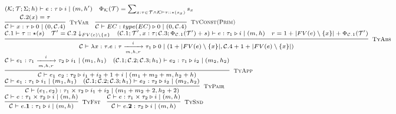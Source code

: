 \documentclass[fleqn]{article}
\begin{document}
\newcommand{\jtygc}[6]{#1 \vdash #2 : #3 \triangleright #4 \mid (#5, #6)}

\[
\scriptsize
\begin{array}{l}
	(\mathcal{K}; \mathcal{T}; \Sigma; h) \vdash e : \tau \triangleright i \mid (m, h') \hspace{1em}
	\Phi_{\mathcal{K}}(\mathcal{T}) = \sum_{x:\tau \in \mathcal{T} \land \mathcal{K} \vdash \tau :: \star(s_x)} s_x \\
	
	\infer[\textsc{TyVar}]{\jtygc{\mathcal{C}}{x}{\tau}{0}{0}{\mathcal{C}.4}}{\mathcal{C}.2(x)=\tau} \hspace{1em}
	
	\infer[\textsc{TyConst(Prim)}]{\jtygc{\mathcal{C}}{EC}{type(EC)}{0}{0}{\mathcal{C}.4}}{} \\
	
	\infer[\textsc{TyAbs}]{\jtygc{ \mathcal{C}}{ \lambda x:\tau. e}{ \tau \xrightarrow[m,h,r]{i} \tau_1 }{ 0 }{ 1 + |FV(e)\setminus \{ x \}| }{\mathcal{C}.4 + 1 + |FV(e)\setminus\{x\}|} }{\mathcal{C}.1 \vdash \tau :: \star(s) & \mathcal{T}'=\mathcal{C}.2 \downarrow_{FV(e) \setminus \{x\}} & \jtygc{(\mathcal{C}.1;\mathcal{T}',x:\tau;\mathcal{C}.3; \Phi_{\mathcal{C}.1}(\mathcal{T}')+s)}{ e }{ \tau_1 }{ i }{ m }{h} & r = 1 + |FV(e)\setminus \{x\}| + \Phi_{\mathcal{C}.1}(\mathcal{T}')} \\
	
	\infer[\textsc{TyApp}]{\jtygc{\mathcal{C}} { e_1~e_2 } { \tau_2 } { i_1 + i_2 + 1 + i } { m_1 + m_2 + m }{h_2+h}}{\jtygc{\mathcal{C}} { e_1 }{ \tau_1 \xrightarrow[m,h,r]{i} \tau_2 }{ i_1 }{ m_1 }{h_1}& \jtygc{(\mathcal{C}.1;\mathcal{C}.2;\mathcal{C}.3;h_1)} { e_2 }{ \tau_1 }{ i_2 }{ m_2}{h_2}} \\
	
	\infer[\textsc{TyPair}]{\jtygc{\mathcal{C}}{ (e_1,e_2) }{ \tau_1 \times \tau_2 }{ i_1 + i_2 }{ m_1 + m_2 + 2}{h_2+2}}{\jtygc{\mathcal{C}}{  e_1 }{ \tau_1 }{ i_1 }{m_1}{h_1} & \jtygc{(\mathcal{C}.1;\mathcal{C}.2;\mathcal{C}.3;h_1) }{ e_2 }{ \tau_2 }{ i_2 }{ m_2}{h_2} } \\
	
	\infer[\textsc{TyFst}]{\jtygc{\mathcal{C} }{ e.\mathbf{1} }{ \tau_1 }{ i }{ m}{h}}{\jtygc{\mathcal{C} }{ e }{ \tau_1 \times \tau_2 }{ i }{ m}{h}} \hspace{1em}
	
	\infer[\textsc{TySnd}]{\jtygc{\mathcal{C} }{ e.\mathbf{2} }{ \tau_2 }{ i }{ m}{h}}{\jtygc{\mathcal{C} }{ e }{ \tau_1 \times \tau_2 }{ i }{ m}{h}} \\
	

\end{array}\]
\end{document}
